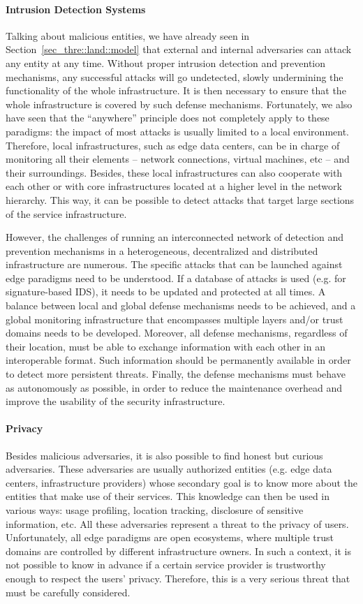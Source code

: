 \documentclass[twocolumn,preprint,3p]{elsarticle}
\begin{document}
\paragraph{Intrusion Detection Systems} Talking about malicious entities, we have already seen in Section~\ref{sec_thre::land::model} that external and internal adversaries can attack any entity at any time. Without proper intrusion detection and prevention mechanisms, any successful attacks will go undetected, slowly undermining the functionality of the whole infrastructure. It is then necessary to ensure that the whole infrastructure is covered by such defense mechanisms. Fortunately, we also have seen that the ``anywhere'' principle does not completely apply to these paradigms: the impact of most attacks is usually limited to a local environment. Therefore, local infrastructures, such as edge data centers, can be in charge of monitoring all their elements -- network connections, virtual machines, etc -- and their surroundings. Besides, these local infrastructures can also cooperate with each other or with core infrastructures located at a higher level in the network hierarchy. This way, it can be possible to detect attacks that target large sections of the service infrastructure.

However, the challenges of running an interconnected network of detection and prevention mechanisms in a heterogeneous, decentralized and distributed infrastructure are numerous. The specific attacks that can be launched against edge paradigms need to be understood. If a database of attacks is used (e.g. for signature-based IDS), it needs to be updated and protected at all times. A balance between local and global defense mechanisms needs to be achieved, and a global monitoring infrastructure that encompasses multiple layers and/or trust domains needs to be developed. Moreover, all defense mechanisms, regardless of their location, must be able to exchange information with each other in an interoperable format. Such information should be permanently available in order to detect more persistent threats. Finally, the defense mechanisms must behave as autonomously as possible, in order to reduce the maintenance overhead and improve the usability of the security infrastructure.

\paragraph{Privacy} Besides malicious adversaries, it is also possible to find honest but curious adversaries. These adversaries are usually authorized entities (e.g. edge data centers, infrastructure providers) whose secondary goal is to know more about the entities that make use of their services. This knowledge can then be used in various ways: usage profiling, location tracking, disclosure of sensitive information, etc. All these adversaries represent a threat to the privacy of users. Unfortunately, all edge paradigms are open ecosystems, where multiple trust domains are controlled by different infrastructure owners. In such a context, it is not possible to know in advance if a certain service provider is trustworthy enough to respect the users' privacy. Therefore, this is a very serious threat that must be carefully considered.
\end{document}
